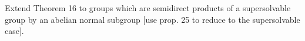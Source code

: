 Extend Theorem 16 to groups which are semidirect products of a supersolvable group by an abelian normal subgroup [use prop. 25 to reduce to the supersolvable case].
